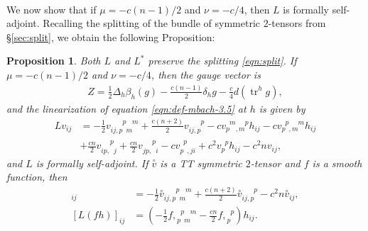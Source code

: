 \documentclass[10pt,reqno]{amsart}
\newtheorem{prop}[theorem]{Proposition}
\DeclareMathOperator{\tr}{tr}
\newcommand{\ttv}{\stackrel{\circ}{v}}
\newcommand{\vdu}[2]{v_{#1}^{\phantom{#1} #2}}
\newcommand{\vdddu}[4]{v_{#1 #2, #3}^{\phantom{#1#2,#3} #4}}
\newcommand{\vddud}[4]{v_{#1 #2, \phantom{#3} #4}^{\phantom{#1#2,} #3 \phantom{#4}}}
\newcommand{\vdudd}[4]{v_{#1 \phantom{#2}, #3 #4}^{\phantom{#1} #2 \phantom{, #3 #4}}}
\newcommand{\vdudu}[4]{v_{#1 \phantom{#2}, #3 \phantom{#4}}^{\phantom{#1} #2 \phantom{, #3} #4}}
\newcommand{\vdddudu}[6]{v_{#1#2,#3\phantom{#4}#5\phantom{#6}}^{\phantom{#1#2,#3}#4\phantom{#5}#6}}
\newcommand{\gendddudu}[7]{{#1}_{#2#3,#4\phantom{#5}#6\phantom{#7}}^{\phantom{#2#3,#4}#5\phantom{#6}#7}}
\newcommand{\gendddu}[5]{{#1}_{#2 #3, #4}^{\phantom{#2#3,#4} #5}}
\newcommand{\fdudu}[4]{{f,}_{#1 \phantom{#2} #3 \phantom{#4}}^{\phantom{#1} #2 \phantom{#3} #4}}
\newcommand{\fdu}[2]{{f,}_{#1}^{\phantom{#1} #2}}
\begin{document}
\

We now show that if $\mu = -c(n-1)/2$ and $\nu = -c/4$, then  $L$ is formally self-adjoint.
Recalling the splitting of the bundle of symmetric $2$-tensors from \S \ref{sec:split}, we obtain the following Proposition:  
\begin{prop} \label{prop:L-selfadj}
Both $L$ and $L^*$ preserve the splitting \eqref{eqn:split}. If $\mu = -c(n-1)/2$ and $\nu = -c/4$, then the gauge vector is
\begin{align} \label{eqn:Z-final-gauge}
Z = \frac{1}{2} \Delta_h \beta_h (g)  -\frac{c(n-1)}{2} \delta_h g - \frac{c}{4} d( \tr^h g ),
\end{align}
and the linearization of equation \eqref{eqn:def-mbach-3.5} at $h$ is given by
\begin{align} \label{eqn:MBF-lin2}
Lv_{ij} &= -\frac{1}{2} \vdddudu{i}{j}{p}{p}{m}{m} + \frac{c(n+2)}{2} \vdddu{i}{j}{p}{p} - c \vdudu{p}{m}{m}{p} h_{ij} -c \vdudu{p}{p}{m}{m} h_{ij} \nonumber \\
&+ \frac{cn}{2} \vddud{i}{p}{p}{j} + \frac{cn}{2} \vddud{j}{p}{p}{i} - c\vdudd{p}{p}{j}{i} + c^2 \vdu{p}{p} h_{ij} - c^2 n v_{ij},
\end{align}
and $L$ is formally self-adjoint.  If $\ttv$ is a TT symmetric $2$-tensor and $f$ is a smooth function, then
\begin{align}
[L\ttv\, ]_{ij} &= -\frac{1}{2} \gendddudu{\ttv}{i}{j}{p}{p}{m}{m} + \frac{c(n+2)}{2} \gendddu{\ttv}{i}{j}{p}{p} - c^2 n \ttv_{ij}, \\
[L(fh)]_{ij} &= \left( -\frac{1}{2} \fdudu{p}{p}{m}{m} - \frac{c n }{2} \fdu{p}{p} \right) h_{ij}. \label{eqn:Lfh}
\end{align}
\end{prop}
\end{document}
